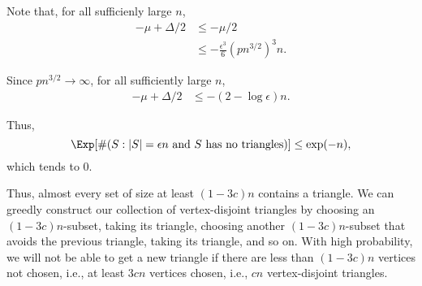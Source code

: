 \documentclass[10pt, a4paper]{article}
\begin{document}
\begin{dem}
	Note that, for all sufficienly large $n$, 
	\begin{align*}
		-\mu + \Delta/2 &\le -\mu/2\\
						&\le -\frac{\epsilon^3}{6} (pn^{3/2})^3 n.
	\end{align*}
	
	Since $pn^{3/2} \to \infty$, for all sufficiently large $n$,
	\begin{align*}
		-\mu + \Delta/2 &\le -(2 - \log\epsilon)n.
	\end{align*}

	Thus,
	\begin{equation*}
		\Exp[\#(S : |S| = \epsilon n \text{ and } S \text{ has no triangles})] \le \exp(-n),
	\end{equation*}
	which tends to $0$.

	Thus, almost every set of size at least $(1 - 3c)n$ contains a triangle. We can greedly construct our collection of vertex-disjoint triangles by choosing an $(1 - 3c)n$-subset, taking its triangle, choosing another $(1 - 3c)n$-subset that avoids the previous triangle, taking its triangle, and so on. With high probability, we will not be able to get a new triangle if there are less than $(1 - 3c)n$ vertices not chosen, i.e., at least $3cn$ vertices chosen, i.e., $cn$ vertex-disjoint triangles.
\end{dem}
\end{document}
